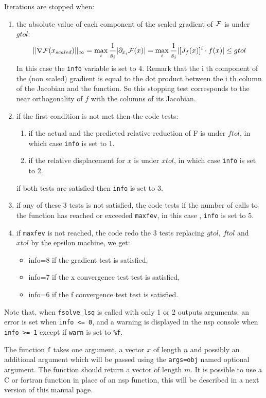 \begin{mandescription}
Iterations are stopped when:
\begin{enumerate}
\item the absolute value of each component of the scaled gradient of ${\cal F}$ is under $gtol$: 
$$
||\nabla{\cal F}(x_{scaled})||_{\infty} = \max_i \frac{1}{s_i} | \partial_{x_i} {\cal F}(x) | =
\max_i \frac{1}{s_i} | [J_f(x)]^i \cdot f(x) | \le gtol
$$
In this case the \verb+info+ variable is set to 4. Remark that the i th component of the (non scaled) 
gradient is equal to the dot product between the i th column of the Jacobian and the function.
So this stopping test corresponds to the near orthogonality of $f$ with the columns of its
Jacobian.
\item if the first condition is not met then the code tests:
      \begin{enumerate}
      \item if the actual and the predicted relative reduction of {\cal F} is under $ftol$, in which case \verb+info+ is set to 1.
      \item if the relative displacement for $x$ is under $xtol$, in which case \verb+info+ is set to 2. 
      \end{enumerate}
      if both tests are satisfied then \verb+info+ is set to 3.
\item if any of these 3 tests is not satisfied, the code tests if the number of calls to the function has reached or 
      exceeded \verb+maxfev+, in this case , \verb+info+ is set to $5$.
\item if \verb+maxfev+ is not reached, the code redo the 3 tests replacing $gtol$, $ftol$ and $xtol$ by the epsilon
      machine, we get:
      \begin{itemize}
      \item info=8 if the gradient test is satisfied,  
      \item info=7 if the x convergence test test is satisfied,  
      \item info=6 if the f convergence test test is satisfied.  
      \end{itemize}
\end{enumerate}
Note that, when \verb+fsolve_lsq+ is called with only 1 or 2 outputs arguments, an error is set 
when \verb+info <= 0+, and a warning is displayed in the nsp console when \verb+info >= 1+ except 
if \verb+warn+ is set to \verb+%f+. 

The function \verb+f+ takes one argument, a vector $x$ of length $n$ and possibly an additional
argument which will be passed using the \verb+args=obj+ named optional argument. The function
should return a vector of length $m$. It is possible to use a C or fortran function in place
of an nsp function, this will be described in a next version of this manual page.


\end{mandescription}
